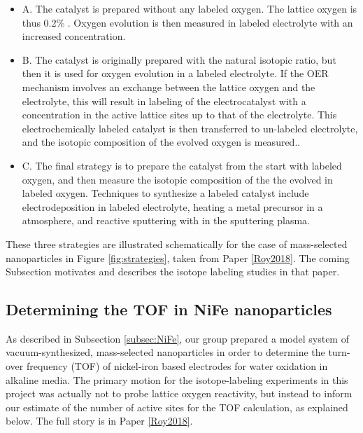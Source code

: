 \begin{itemize}
	\item A. The catalyst is prepared without any labeled oxygen. The lattice oxygen is thus 0.2\% . Oxygen evolution is then measured in labeled electrolyte with an increased  concentration\cite{Wohlfahrt-Mehrens1987, Fierro2007, Macounova2009, Amin2017, Roy2018a}.
	
	\item B. The catalyst is originally prepared with the natural isotopic ratio, but then it is used for oxygen evolution in a labeled electrolyte. If the OER mechanism involves an exchange between the lattice oxygen and the electrolyte, this will result in labeling of the electrocatalyst with a  concentration in the active lattice sites up to that of the electrolyte. This electrochemically labeled catalyst is then transferred to un-labeled electrolyte, and the isotopic composition of the evolved oxygen is measured.\cite{Willsau1985, Diaz-Morales2013, Stoerzinger2017a, Amin2017, Grimaud2017, Roy2018a}.
	
	\item C. The final strategy is to prepare the catalyst from the start with labeled oxygen, and then measure the isotopic composition of the the  evolved in labeled oxygen. Techniques to synthesize a labeled catalyst include electrodeposition in labeled electrolyte\cite{Surendranath2010}, heating a metal precursor in a  atmosphere\cite{Roy2018a}, and reactive sputtering with  in the sputtering plasma\cite{Geiger2018}.
\end{itemize}

These three strategies are illustrated schematically for the case of mass-selected nanoparticles in Figure \ref{fig:strategies}, taken from Paper \ref{Roy2018}. The coming Subsection motivates and describes the isotope labeling studies in that paper.

\subsection{Determining the TOF in NiFe nanoparticles}

As described in Subsection \ref{subsec:NiFe}, our group prepared a model system of vacuum-synthesized, mass-selected  nanoparticles in order to determine the turn-over frequency (TOF) of nickel-iron based electrodes for water oxidation in alkaline media. The primary motion for the isotope-labeling experiments in this project was actually not to probe lattice oxygen reactivity, but instead to inform our estimate of the number of active sites for the TOF calculation, as explained below. The full story is in Paper \ref{Roy2018}. 

